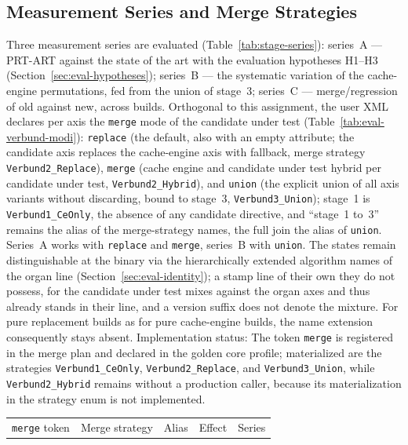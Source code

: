 \begin{nurlang}
\subsection{Measurement Series and Merge Strategies}\label{sec:eval-series}
Three measurement series are evaluated (Table~\ref{tab:stage-series}): series~A --- PRT-ART against
the state of the art with the evaluation hypotheses H1--H3 (Section~\ref{sec:eval-hypotheses});
series~B --- the systematic variation of the cache-engine permutations, fed from the union of
stage~3; series~C --- merge/regression of old against new, across builds. Orthogonal to this
assignment, the user XML declares per axis the \texttt{merge} mode of the candidate under test
(Table~\ref{tab:eval-verbund-modi}): \texttt{replace} (the default, also with an empty attribute; the
candidate axis replaces the cache-engine axis with fallback, merge strategy
\texttt{Verbund2\_Replace}), \texttt{merge} (cache engine and candidate under test hybrid per candidate under test,
\texttt{Verbund2\_Hybrid}), and \texttt{union} (the explicit union of all axis variants without
discarding, bound to stage~3, \texttt{Verbund3\_Union}); stage~1 is \texttt{Verbund1\_CeOnly}, the
absence of any candidate directive, and \enquote{stage~1 to~3} remains the alias of the merge-strategy
names, the full join the alias of \texttt{union}. Series~A works with \texttt{replace} and
\texttt{merge}, series~B with \texttt{union}. The states remain distinguishable at the binary via
the hierarchically extended algorithm names of the organ line (Section~\ref{sec:eval-identity}); a
stamp line of their own they do not possess, for the candidate under test mixes against the organ axes and thus
already stands in their line, and a version suffix does not denote the mixture. For pure replacement
builds as for pure cache-engine builds, the name extension consequently stays absent. Implementation
status: The token \texttt{merge} is registered in the merge plan and declared in the golden core
profile; materialized are the strategies \texttt{Verbund1\_CeOnly}, \texttt{Verbund2\_Replace}, and
\texttt{Verbund3\_Union}, while \texttt{Verbund2\_Hybrid} remains without a production caller,
because its materialization in the strategy enum is not implemented.
\begin{table}[htbp]\centering\footnotesize
\begin{tabular}{@{}ll>{\raggedright\arraybackslash}p{2.2cm}>{\raggedright\arraybackslash}p{4.4cm}>{\raggedright\arraybackslash}p{1.6cm}@{}}
\toprule
\texttt{merge} token & Merge strategy & Alias & Effect & Series \\

\end{tabular}
\end{table}
\end{nurlang}
